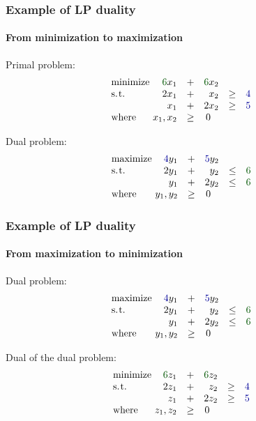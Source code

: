 \documentclass{beamer}
\renewcommand{\.}{\hskip .75pt}
\begin{document}
\begin{frame}
	\frametitle{Example of LP duality}
	\framesubtitle{From minimization to maximization}
	
	Primal problem:
	$$
	\begin{array}{lrcrcl}
		\text{minimize\!\!\!\!} & \textcolor{dgreen}{6}x_1 & + & \textcolor{dgreen}{6}x_2 \\
		\text{s.\.t.} & 2x_1 & + & x_2 & \ge & \textcolor{dblue}{4} \\
		& x_1 & + & 2x_2 & \ge & \textcolor{dblue}{5} \\
		\text{where}& x_1, x_2 &\ge& 0~\,~ &
	\end{array}
	$$
	\pause 
	\bigskip
	
	Dual problem:
	$$
	\begin{array}{lrcrcl}
		\text{maximize\!\!\!\!} & \textcolor{dblue}{4}y_1 & + & \textcolor{dblue}{5}y_2 \\
		\text{s.\.t.} & 2y_1 & + & y_2 & \le & \textcolor{dgreen}{6} \\
		& y_1 & + & 2y_2 & \le & \textcolor{dgreen}{6} \\
		\text{where}& y_1, y_2 &\ge& 0~\,~ &
	\end{array}
	$$
	
\end{frame}

\begin{frame}
	\frametitle{Example of LP duality}
	\framesubtitle{From maximization to minimization}
	
	Dual problem:
	$$
	\begin{array}{lrcrcl}
		\text{maximize\!\!\!\!} & \textcolor{dblue}{4}y_1 & + & \textcolor{dblue}{5}y_2 \\
		\text{s.\.t.} & 2y_1 & + & y_2 & \le & \textcolor{dgreen}{6} \\
		& y_1 & + & 2y_2 & \le & \textcolor{dgreen}{6} \\
		\text{where}& y_1, y_2 &\ge& 0~\,~ &
	\end{array}
	$$
	\pause 
	\bigskip
	
	Dual of the dual problem:
	$$
	\begin{array}{lrcrcl}
		\text{minimize\!\!\!\!} & \textcolor{dgreen}{6}z_1 & + & \textcolor{dgreen}{6}z_2 \\
		\text{s.\.t.} & 2z_1 & + & z_2 & \ge & \textcolor{dblue}{4} \\
		& z_1 & + & 2z_2 & \ge & \textcolor{dblue}{5} \\
		\text{where}& z_1, z_2 &\ge& 0~\,~ &
	\end{array}
	$$
	
\end{frame}
\end{document}
